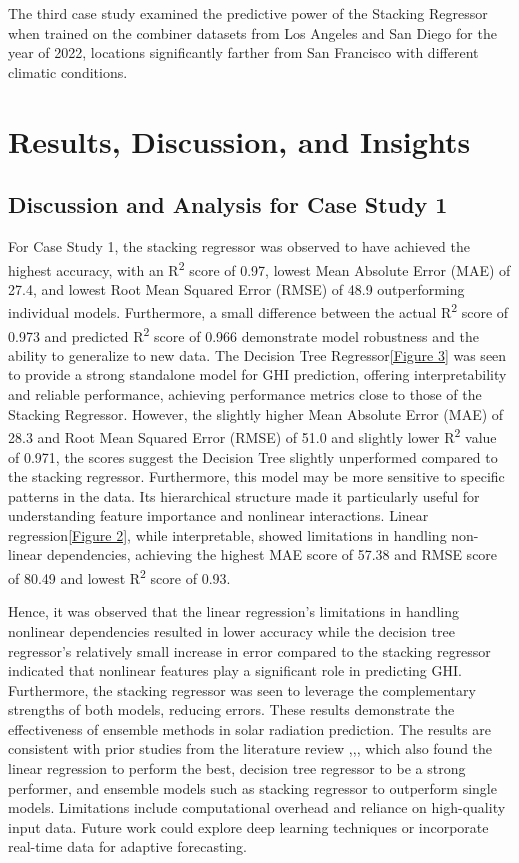 \documentclass[10pt,twocolumn]{article}
\begin{document}
\begin{itemize}
The third case study examined the predictive power of the Stacking Regressor when trained on the combiner datasets from Los Angeles and San Diego for the year of 2022, locations significantly farther from San Francisco with different climatic conditions.




\section{Results, Discussion, and Insights}
\subsection{Discussion and Analysis for Case Study 1}
For Case Study 1, the stacking regressor was observed to have achieved the highest accuracy, with an R\textsuperscript{2} score of 0.97, lowest Mean Absolute Error (MAE) of 27.4, and lowest Root Mean Squared Error (RMSE) of 48.9 outperforming individual models. Furthermore, a small difference between the actual R\textsuperscript{2} score of 0.973 and predicted R\textsuperscript{2} score of 0.966 demonstrate model robustness and the ability to generalize to new data.
The Decision Tree Regressor\ref{Figure 3} was seen to provide a strong standalone model for GHI prediction, offering interpretability and reliable performance, achieving performance metrics close to those of the Stacking Regressor. However, the slightly higher Mean Absolute Error (MAE) of 28.3 and Root Mean Squared Error (RMSE) of 51.0 and slightly lower  R\textsuperscript{2} value of 0.971, the scores suggest the Decision Tree slightly unperformed compared to the stacking regressor. Furthermore, this model may be more sensitive to specific patterns in the data. Its hierarchical structure made it particularly useful for understanding feature importance and nonlinear interactions. 
Linear regression\ref{Figure 2}, while interpretable, showed limitations in handling non-linear dependencies, achieving the highest MAE score of 57.38 and RMSE score of 80.49 and lowest R\textsuperscript{2} score of 0.93. 

Hence, it was observed that the linear regression's  limitations in handling nonlinear dependencies resulted in lower accuracy while the decision tree regressor's relatively small increase in error compared to the stacking regressor indicated that nonlinear features play a significant role in predicting GHI. Furthermore,
the stacking regressor was seen to leverage the complementary strengths of both models, reducing errors. These results demonstrate the effectiveness of ensemble methods in solar radiation prediction. The results are consistent with prior studies from the literature review \cite{3},\cite{18},\cite{17}, which also found the linear regression to perform the best, decision tree regressor to be a strong performer, and ensemble models such as stacking regressor to outperform single models. 
Limitations include computational overhead and reliance on high-quality input data. Future work could explore deep learning techniques or incorporate real-time data for adaptive forecasting.

\end{itemize}
\end{document}
